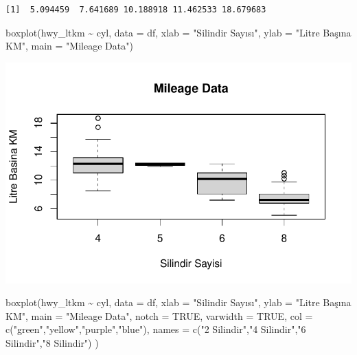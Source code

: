\documentclass[
  letterpaper,
  DIV=11,
  numbers=noendperiod]{scrreprt}
\newenvironment{Shaded}{\begin{snugshade}}{\end{snugshade}}
\newcommand{\AttributeTok}[1]{\textcolor[rgb]{0.40,0.45,0.13}{#1}}
\newcommand{\ConstantTok}[1]{\textcolor[rgb]{0.56,0.35,0.01}{#1}}
\newcommand{\FunctionTok}[1]{\textcolor[rgb]{0.28,0.35,0.67}{#1}}
\newcommand{\NormalTok}[1]{\textcolor[rgb]{0.00,0.23,0.31}{#1}}
\newcommand{\SpecialCharTok}[1]{\textcolor[rgb]{0.37,0.37,0.37}{#1}}
\newcommand{\StringTok}[1]{\textcolor[rgb]{0.13,0.47,0.30}{#1}}
\begin{document}
\begin{verbatim}
[1]  5.094459  7.641689 10.188918 11.462533 18.679683
\end{verbatim}

\begin{Shaded}
\begin{Highlighting}[]
\FunctionTok{boxplot}\NormalTok{(hwy\_ltkm }\SpecialCharTok{\textasciitilde{}}\NormalTok{ cyl, }\AttributeTok{data =}\NormalTok{ df, }\AttributeTok{xlab =} \StringTok{"Silindir Sayısı"}\NormalTok{,}
   \AttributeTok{ylab =} \StringTok{"Litre Başına KM"}\NormalTok{, }\AttributeTok{main =} \StringTok{"Mileage Data"}\NormalTok{)}
\end{Highlighting}
\end{Shaded}

\includegraphics{data_analysis_files/figure-pdf/unnamed-chunk-2-6.pdf}

\begin{Shaded}
\begin{Highlighting}[]
\FunctionTok{boxplot}\NormalTok{(hwy\_ltkm }\SpecialCharTok{\textasciitilde{}}\NormalTok{ cyl, }\AttributeTok{data =}\NormalTok{ df, }
   \AttributeTok{xlab =} \StringTok{"Silindir Sayısı"}\NormalTok{,}
   \AttributeTok{ylab =} \StringTok{"Litre Başına KM"}\NormalTok{, }
   \AttributeTok{main =} \StringTok{"Mileage Data"}\NormalTok{,}
   \AttributeTok{notch =} \ConstantTok{TRUE}\NormalTok{, }
   \AttributeTok{varwidth =} \ConstantTok{TRUE}\NormalTok{, }
   \AttributeTok{col =} \FunctionTok{c}\NormalTok{(}\StringTok{"green"}\NormalTok{,}\StringTok{"yellow"}\NormalTok{,}\StringTok{"purple"}\NormalTok{,}\StringTok{"blue"}\NormalTok{),}
   \AttributeTok{names =} \FunctionTok{c}\NormalTok{(}\StringTok{"2 Silindir"}\NormalTok{,}\StringTok{"4 Silindir"}\NormalTok{,}\StringTok{"6 Silindir"}\NormalTok{,}\StringTok{"8 Silindir"}\NormalTok{)}
\NormalTok{)}
\end{Highlighting}
\end{Shaded}
\end{document}
